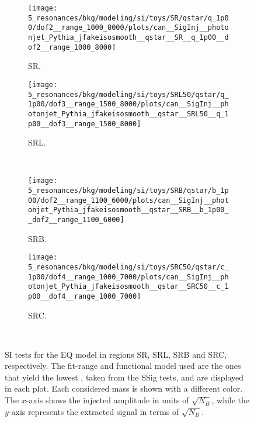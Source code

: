 \begin{figure}[ht!]
    \centering
    \begin{subfigure}[h]{0.49\linewidth}
        \centering
        \texttt{[image: 5\_resonances/bkg/modeling/si/toys/SR/qstar/q\_1p00/dof2\_\_range\_1000\_8000/plots/can\_\_SigInj\_\_photonjet\_Pythia\_jfakeisosmooth\_\_qstar\_\_SR\_\_q\_1p00\_\_dof2\_\_range\_1000\_8000]}
        \caption{SR.}
    \end{subfigure}
    \hfill
    \begin{subfigure}[h]{0.49\linewidth}
        \centering
        \texttt{[image: 5\_resonances/bkg/modeling/si/toys/SRL50/qstar/q\_1p00/dof3\_\_range\_1500\_8000/plots/can\_\_SigInj\_\_photonjet\_Pythia\_jfakeisosmooth\_\_qstar\_\_SRL50\_\_q\_1p00\_\_dof3\_\_range\_1500\_8000]}
        \caption{SRL.}
    \end{subfigure}\\
    \begin{subfigure}[h]{0.49\linewidth}
        \centering
        \texttt{[image: 5\_resonances/bkg/modeling/si/toys/SRB/qstar/b\_1p00/dof2\_\_range\_1100\_6000/plots/can\_\_SigInj\_\_photonjet\_Pythia\_jfakeisosmooth\_\_qstar\_\_SRB\_\_b\_1p00\_\_dof2\_\_range\_1100\_6000]}
        \caption{SRB.}
    \end{subfigure}
    \hfill
    \begin{subfigure}[h]{0.49\linewidth}
        \centering
        \texttt{[image: 5\_resonances/bkg/modeling/si/toys/SRC50/qstar/c\_1p00/dof4\_\_range\_1000\_7000/plots/can\_\_SigInj\_\_photonjet\_Pythia\_jfakeisosmooth\_\_qstar\_\_SRC50\_\_c\_1p00\_\_dof4\_\_range\_1000\_7000]}
        \caption{SRC.}
    \end{subfigure}\\
    \caption{\ac{SI} tests for the \ac{EQ} model in regions SR, SRL, SRB and SRC, respectively. The fit-range and functional model used are the ones that yield the lowest \sspur, taken from the \ac{SSig} tests, and are displayed in each plot. Each considered mass is shown with a different color. The \(x\)-axis shows the injected amplitude in units of \(\sqrt{N_B}\), while the \(y\)-axis represents the extracted signal in terms of \(\sqrt{N_B}\).}
    \label{fig:bkg:modeling:sigbkg:sitest:siginj_qstar}
\end{figure}






